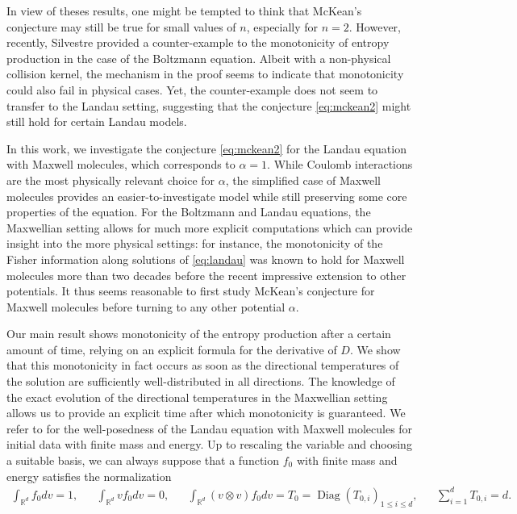 \documentclass[11pt,a4paper]{article}
\theoremstyle{definition}
\theoremstyle{plain}
\DeclareMathOperator*{\Diag}{Diag}
\begin{document}
In view of theses results, one might be tempted to think that McKean's conjecture may still be true for small values of $n$, especially for $n=2$. However, recently, Silvestre \cite{Silvestre2026} provided a counter-example to the monotonicity of entropy production in the case of the Boltzmann equation. Albeit with a non-physical collision kernel, the mechanism in the proof seems to indicate that monotonicity could also fail in physical cases. Yet, the counter-example does not seem to transfer to the Landau setting, suggesting that the conjecture \eqref{eq:mckean2} might still hold for certain Landau models.

In this work, we investigate the conjecture \eqref{eq:mckean2} for the Landau equation with Maxwell molecules, which corresponds to $\alpha=1$. While Coulomb interactions are the most physically relevant choice for $\alpha$, the simplified case of Maxwell molecules provides an easier-to-investigate model while still preserving some core properties of the equation. For the Boltzmann and Landau equations, the Maxwellian setting allows for much more explicit computations which can provide insight into the more physical settings: for instance, the monotonicity of the Fisher information along solutions of \eqref{eq:landau} was known to hold for Maxwell molecules \cite{Toscani1998,Villani2000, Villani1998a} more than two decades before the recent impressive extension \cite{GuillenSilvestre2023, ImbertSilvestreVillani2024} to other potentials. It thus seems reasonable to first study McKean's conjecture for Maxwell molecules before turning to any other potential $\alpha$.

Our main result shows monotonicity of the entropy production after a certain amount of time, relying on an explicit formula for the derivative of $D$. We show that this monotonicity in fact occurs as soon as the directional temperatures of the solution are sufficiently well-distributed in all directions. The knowledge of the exact evolution of the directional temperatures in the Maxwellian setting allows us to provide an explicit time after which monotonicity is guaranteed. We refer to \cite{Villani1998b} for the well-posedness of the Landau equation with Maxwell molecules for initial data with finite mass and energy. Up to rescaling the variable and choosing a suitable basis, we can always suppose that a function $f_0$ with finite mass and energy satisfies the normalization
 \begin{align}
    \label{eq:normalization}
        \int_{\mathbb{R}^d} f_0 dv=1, &&\! \int_{\mathbb{R}^d} v f_0 dv=0,&& \! \int_{\mathbb{R}^d} (v\otimes v) f_0 dv=T_0=\Diag(T_{0,i})_{1\leq i \leq d},&&\!  \sum_{i=1}^d T_{0,i}=d.
    \end{align}
\end{document}
